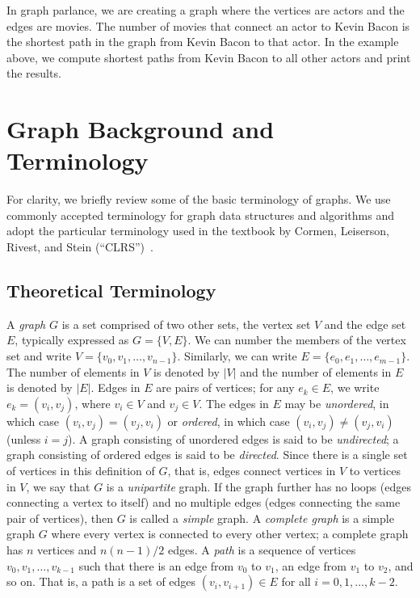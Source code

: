 In graph parlance, we are creating a graph where the vertices are actors and the edges are movies.
The number of movies that connect an actor to Kevin Bacon is the shortest path in the graph
from Kevin Bacon to that actor. In the example above, we compute shortest paths from Kevin
Bacon to all other actors and print the results.


\section{Graph Background and Terminology}

For clarity, we briefly review some of the basic terminology of graphs.
We use commonly accepted terminology for graph data structures and algorithms and
adopt the particular terminology used in the textbook by
Cormen, Leiserson, Rivest, and Stein (``CLRS'')~\cite{CLRS2022}.

\subsection{Theoretical Terminology}

A \emph{graph} $G$ is a set comprised of two other sets, the vertex set $V$ and the edge set $E$,
typically expressed as $G=\{V,E\}$. We can number the members of the vertex set
and write $V = \{ v_0, v_1, \ldots , v_{n-1} \}$. Similarly, we can write $E = \{ e_0, e_1, \ldots, e_{m-1} \}$. The number of elements in $V$ is denoted by $|V|$ and the number of elements in $E$ is denoted by $|E|$. Edges in $E$ are pairs of vertices; for any $e_k \in E$, we write $e_k = ( v_i, v_j )$, where $v_i \in V$ and $v_j\in V$. The edges in $E$ may be \emph{unordered}, in which case $(v_i, v_j) = (v_j, v_i)$ or \emph{ordered}, in which case $(v_i, v_j) \neq (v_j, v_i)$ (unless $i = j$).
A graph consisting of unordered edges is said to be \emph{undirected};
a graph consisting of ordered edges is said to be \emph{directed}.
Since there is a single set of vertices in this definition of $G$, that is, edges connect
vertices in $V$ to vertices in $V$, we say that
$G$ is a \emph{unipartite} graph.
If the graph further has no loops (edges connecting a vertex to itself)
and no multiple edges (edges connecting the same pair of vertices),
then $G$ is called a \emph{simple} graph.
A \emph{complete graph} is a simple graph $G$ where every vertex is connected
to every other vertex; a complete graph has
$n$ vertices and $n(n-1)/2$ edges.
A \emph{path} is a sequence of vertices $v_0, v_1, \ldots, v_{k-1}$ such that
there is an edge from $v_0$ to $v_1$, an edge from $v_1$ to $v_2$, and so on.
That is, a path is a set of edges $(v_i, v_{i+1}) \in E$ for all $i = 0, 1, \ldots, k-2$.

